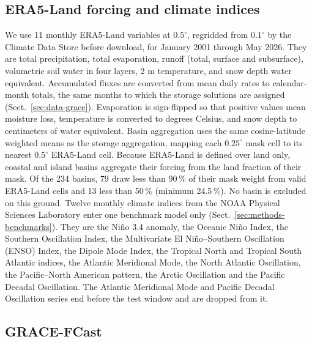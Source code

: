 \documentclass[hess, manuscript]{copernicus}
\begin{document}
\subsection{ERA5-Land forcing and climate indices}
\label{sec:data-era5}

We use 11 monthly ERA5-Land variables \citep{munozsabater2021era5land,
c3s2019era5land} at $0.5^{\circ}$, regridded from $0.1^{\circ}$ by the
Climate Data Store before download, for January 2001
through May 2026. They are total precipitation, total evaporation, runoff
(total, surface and subsurface), volumetric soil water in four layers, 2 m temperature,
and snow depth water equivalent.
Accumulated fluxes are converted from mean daily rates to calendar-month
totals, the same months to which the storage solutions are assigned
(Sect.~\ref{sec:data-grace}). Evaporation is sign-flipped so that positive
values mean moisture loss, temperature is converted to degrees Celsius, and
snow depth to centimeters of water equivalent. Basin aggregation uses the same cosine-latitude
weighted means as the storage aggregation, mapping each $0.25^{\circ}$
mask cell to its nearest $0.5^{\circ}$ ERA5-Land cell. Because ERA5-Land is
defined over land only, coastal and island basins aggregate their forcing
from the land fraction of their mask. Of the 234 basins, 79 draw less than
90\,\% of their mask weight from valid ERA5-Land cells and 13 less than
50\,\% (minimum 24.5\,\%). No basin is excluded on this ground.
Twelve monthly climate indices from the NOAA Physical Sciences
Laboratory enter one benchmark model only
(Sect.~\ref{sec:methods-benchmarks}). They are the Ni\~no 3.4 anomaly, the Oceanic
Ni\~no Index, the Southern Oscillation Index, the Multivariate El Ni\~no--Southern Oscillation (ENSO) Index,
the Dipole Mode Index, the Tropical North and Tropical South Atlantic
indices, the Atlantic Meridional Mode, the North Atlantic Oscillation, the
Pacific--North American pattern, the Arctic Oscillation and the Pacific
Decadal Oscillation. The Atlantic Meridional Mode and Pacific Decadal
Oscillation series end before the test window and are dropped from it.

\subsection{GRACE-FCast}
\label{sec:data-li}
\end{document}
